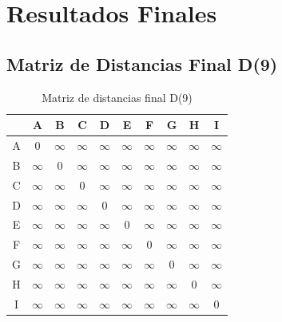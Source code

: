 \documentclass[12pt]{article}
\begin{document}
\clearpage
\section{Resultados Finales}
\subsection{Matriz de Distancias Final D(9)}
\begin{table}[h!]
\centering
\begin{tabular}{|c|c|c|c|c|c|c|c|c|c|}
\hline
 & A & B & C & D & E & F & G & H & I \\\hline
A & 0 & $\infty$ & $\infty$ & $\infty$ & $\infty$ & $\infty$ & $\infty$ & $\infty$ & $\infty$ \\\hline
B & $\infty$ & 0 & $\infty$ & $\infty$ & $\infty$ & $\infty$ & $\infty$ & $\infty$ & $\infty$ \\\hline
C & $\infty$ & $\infty$ & 0 & $\infty$ & $\infty$ & $\infty$ & $\infty$ & $\infty$ & $\infty$ \\\hline
D & $\infty$ & $\infty$ & $\infty$ & 0 & $\infty$ & $\infty$ & $\infty$ & $\infty$ & $\infty$ \\\hline
E & $\infty$ & $\infty$ & $\infty$ & $\infty$ & 0 & $\infty$ & $\infty$ & $\infty$ & $\infty$ \\\hline
F & $\infty$ & $\infty$ & $\infty$ & $\infty$ & $\infty$ & 0 & $\infty$ & $\infty$ & $\infty$ \\\hline
G & $\infty$ & $\infty$ & $\infty$ & $\infty$ & $\infty$ & $\infty$ & 0 & $\infty$ & $\infty$ \\\hline
H & $\infty$ & $\infty$ & $\infty$ & $\infty$ & $\infty$ & $\infty$ & $\infty$ & 0 & $\infty$ \\\hline
I & $\infty$ & $\infty$ & $\infty$ & $\infty$ & $\infty$ & $\infty$ & $\infty$ & $\infty$ & 0 \\\hline
\end{tabular}
\caption{Matriz de distancias final D(9)}
\end{table}

\clearpage
\end{document}
